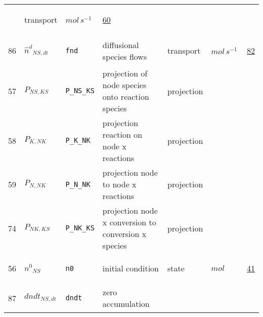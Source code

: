 \begin{longtable}{|p{1cm}|p{3cm}|p{5cm}|p{7.5cm}|p{3.0cm}|p{3cm}|p{1cm}|}
             & \begin{lay}transport \end{lay}
             & $ mol \,s^{-1} \, $
             & \hyperlink{"e:60"}{ 60 }
                 \\
    86
             & \hypertarget{"v:86"}{ $ {\hat{n}^{d}}_{{N S}, dt} $}
             & \verb|fnd|
             & diffusional species flows
             & \begin{lay}transport \end{lay}
             & $ mol \,s^{-1} \, $
             & \hyperlink{"e:82"}{ 82 }
                 \\
    57
             & \hypertarget{"v:57"}{ $ {P}_{{N S}, {K S}} $}
             & \verb|P_NS_KS|
             & projection of node species onto reaction species
             & \begin{lay}projection \end{lay}
             & $  $
             & \\
    58
             & \hypertarget{"v:58"}{ $ {P}_{K, {N K}} $}
             & \verb|P_K_NK|
             & projection reaction on node x reactions
             & \begin{lay}projection \end{lay}
             & $  $
             & \\
    59
             & \hypertarget{"v:59"}{ $ {P}_{N, {N K}} $}
             & \verb|P_N_NK|
             & projection node to node x reactions
             & \begin{lay}projection \end{lay}
             & $  $
             & \\
    74
             & \hypertarget{"v:74"}{ $ {P}_{{N K}, {K S}} $}
             & \verb|P_NK_KS|
             & projection node x conversion to conversion x species
             & \begin{lay}projection \end{lay}
             & $  $
             & \\
    56
             & \hypertarget{"v:56"}{ $ {n^{0}}_{{N S}} $}
             & \verb|n0|
             & initial condition
             & \begin{lay}state \end{lay}
             & $ mol \, $
             & \hyperlink{"e:41"}{ 41 }
                 \\
    87
             & \hypertarget{"v:87"}{ $ {dndt}_{{N S}, dt} $}
             & \verb|dndt|
             & zero accumulation

\end{longtable}
